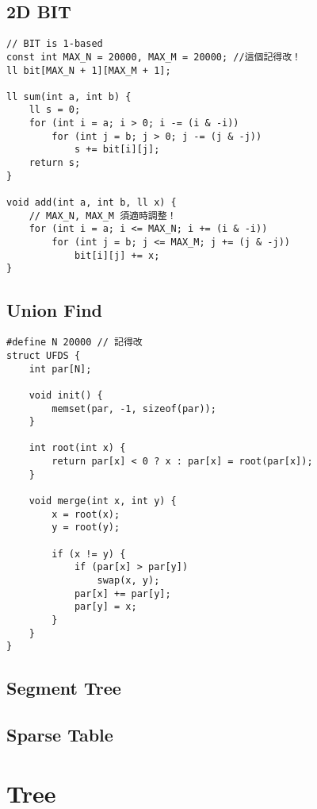 \documentclass[10pt,oneside]{article}
\begin{document}
\begin{landscape}
\begin{multicols}{2}
\subsection{2D BIT}

\begin{lstlisting}
// BIT is 1-based
const int MAX_N = 20000, MAX_M = 20000; //這個記得改！
ll bit[MAX_N + 1][MAX_M + 1];

ll sum(int a, int b) {
    ll s = 0;
    for (int i = a; i > 0; i -= (i & -i))
        for (int j = b; j > 0; j -= (j & -j))
            s += bit[i][j];
    return s;
}

void add(int a, int b, ll x) {
	// MAX_N, MAX_M 須適時調整！
    for (int i = a; i <= MAX_N; i += (i & -i))
        for (int j = b; j <= MAX_M; j += (j & -j))
            bit[i][j] += x;
}
\end{lstlisting}

\subsection{Union Find}

\begin{lstlisting}
#define N 20000 // 記得改
struct UFDS {
    int par[N];

    void init() {
        memset(par, -1, sizeof(par));
    }

    int root(int x) {
        return par[x] < 0 ? x : par[x] = root(par[x]);
    }

    void merge(int x, int y) {
        x = root(x);
        y = root(y);

        if (x != y) {
            if (par[x] > par[y])
                swap(x, y);
            par[x] += par[y];
            par[y] = x;
        }
    }
}
\end{lstlisting}

\subsection{Segment Tree}


\subsection{Sparse Table}



\section{Tree}


\end{multicols}
\end{landscape}
\end{document}

